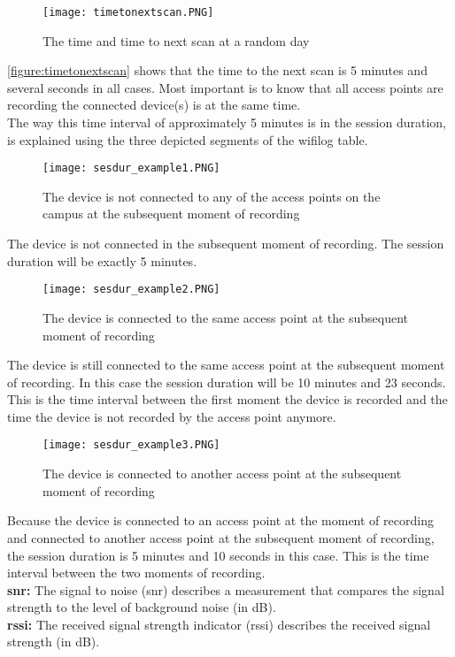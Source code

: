 \begin{figure}[H]
	\centering
	\texttt{[image: timetonextscan.PNG]}
	\captionsetup{justification=centering}
	\caption{The time and time to next scan at a random day}
	\label{figure:timetonextscan}
\end{figure}

\autoref{figure:timetonextscan} shows that the time to the next scan is 5 minutes and several seconds in all cases. Most important is to know that all access points are recording the connected device(s) is at the same time. 
\\
The way this time interval of approximately 5 minutes is in the session duration, is explained using the three depicted segments of the wifilog table.

\begin{figure}[H]
	\centering
	\texttt{[image: sesdur\_example1.PNG]}
	\captionsetup{justification=centering}
	\caption{The device is not connected to any of the access points on the campus at the subsequent moment of recording}
	\label{sesdur_example1}
\end{figure}
The device is not connected in the subsequent moment of recording. The session duration will be exactly 5 minutes.
\\
\begin{figure}[H]
	\centering
	\texttt{[image: sesdur\_example2.PNG]}
	\captionsetup{justification=centering}
	\caption{The device is connected to the same access point at the subsequent moment of recording}
	\label{sesdur_example2}
\end{figure}
The device is still connected to the same access point at the subsequent moment of recording. In this case the session duration will be 10 minutes and 23 seconds. This is the time interval between the first moment the device is recorded and the time the device is not recorded by the access point anymore.
\\
\begin{figure}[H]
	\centering
	\texttt{[image: sesdur\_example3.PNG]}
	\captionsetup{justification=centering}
	\caption{The device is connected to another access point at the subsequent moment of recording}
	\label{sesdur_exampl3e}
\end{figure}
Because the device is connected to an access point at the moment of recording and connected to another access point at the subsequent moment of recording, the session duration is 5 minutes and 10 seconds in this case. This is the time interval between the two moments of recording.
\\
\textbf{snr:}
The signal to noise (snr) describes a measurement that compares the signal strength to the level of background noise (in dB).
\\
\textbf{rssi:}
The received signal strength indicator (rssi) describes the received signal strength (in dB).

